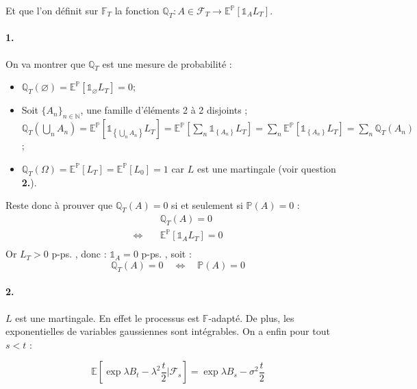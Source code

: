 \documentclass[a4paper,10pt]{report}
\begin{document}
Et que l'on définit sur $\mathbb{F}_T$ la fonction $\mathbb{Q}_T : A \in \mathcal{F}_T \to \mathbb{E}^{\mathbb{P}}\left[\mathds{1}_{A} L_{T}\right]$.

\paragraph{1.} On va montrer que $\mathbb{Q}_T$ est une mesure de probabilité :
\begin{itemize}
\item $\mathbb{Q}_T(\varnothing ) = \mathbb{E}^\mathbb{P}\left[ \mathds{1}_\varnothing L_T\right] = 0$;
\item Soit $\{A_n\}_{n \in \mathbb{N} }$, une famille d'éléments 2 à 2 disjoints ;\\
$\mathbb{Q}_T(\bigcup_n A_n) = \mathbb{E}^\mathbb{P}\left[ \mathds{1}_{\left\{ \bigcup_n A_n \right\}} L_T\right] = \mathbb{E}^\mathbb{P}\left[ \sum_n \mathds{1}_{\left\{ A_n \right\}} L_T\right] = \sum_n \mathbb{E}^\mathbb{P}\left[ \mathds{1}_{\left\{ A_n \right\}} L_T\right] = \sum_n \mathbb{Q}_T(A_n)$;
\item $\mathbb{Q}_T(\Omega) = \mathbb{E}^\mathbb{P}\left[ L_T\right] = \mathbb{E}^\mathbb{P}\left[ L_0\right] = 1$ car $L$ est une martingale (voir question \textbf{2.}).
\end{itemize}

Reste donc à prouver que $\mathbb{Q}_T(A) = 0$ si et seulement si $\mathbb{P}(A) = 0$ :
$$
\begin{aligned}
& \mathbb{Q}_T(A) = 0 \\
\Leftrightarrow \quad & \mathbb{E}^{\mathbb{P}}\left[\mathds{1}_A L_T\right] = 0 \\
\end{aligned}
$$
Or $L_T > 0$ p-ps. , donc : $\mathds{1}_A = 0$ p-ps. , soit :
$$
\mathbb{Q}_T(A) = 0 \quad \Leftrightarrow \quad  \mathbb{P}(A) = 0
$$




\paragraph{2.} $L$ est une martingale. En effet le processus est $\mathbb{F}$-adapté. De plus, les exponentielles de variables gaussiennes sont intégrables. On a enfin pour tout $s < t$ :

$$
\mathbb{E}\left[\exp{\lambda B_{t}-\lambda^{2} \frac{t}{2}} | \mathcal{F}_{s}\right] = \exp{\lambda B_{s}-\sigma^{2} \frac{t}{2}}
$$
\end{document}
